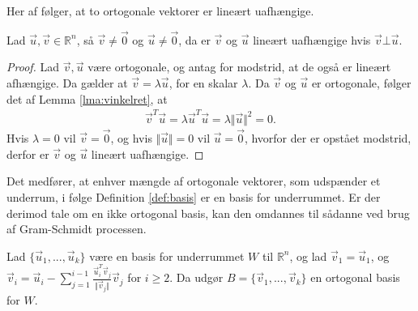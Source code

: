 Her af følger, at to ortogonale vektorer er lineært uafhængige.
\begin{lma}
Lad $\vec{u}, \vec{v} \in \mathds{R}^n$, så $\vec{v} \neq \vec{0}$ og $\vec{u} \neq \vec{0}$, da er $\vec{v}$ og $\vec{u}$ lineært uafhængige hvis $\vec{v} \bot \vec{u}$.
\label{lma:ortolinuaf}
\end{lma}
\begin{proof}
Lad $\vec{v}, \vec{u}$ være ortogonale, og antag for modstrid, at de også er lineært afhængige.
Da gælder at $\vec{v} = \lambda \vec{u}$, for en skalar $\lambda$.
Da $\vec{v}$ og $\vec{u}$ er ortogonale, følger det af Lemma \ref{lma:vinkelret}, at 
\begin{align*}
\vec{v}^T\vec{u} = \lambda\vec{u}^T\vec{u} = \lambda \Vert \vec{u} \Vert^2 = 0.
\end{align*}
Hvis $\lambda = 0$ vil $\vec{v}= \vec{0}$, og hvis $\Vert \vec{u} \Vert = 0$ vil $\vec{u} = \vec{0}$, hvorfor der er opstået modstrid, derfor er $\vec{v}$ og $\vec{u}$ lineært uafhængige.
\end{proof}
Det medfører, at enhver mængde af ortogonale vektorer, som udspænder et underrum, i følge Definition \ref{def:basis} er
en basis for underrummet.
Er der derimod tale om en ikke ortogonal basis, kan den omdannes til sådanne ved brug af Gram-Schmidt processen.
\begin{stn}
Lad $\{\vec{u}_1, ..., \vec{u}_k\}$ være en basis for underrummet $W$ til $\mathds{R}^n$, og lad 
$\vec{v}_1 = \vec{u}_1$, og $\vec{v}_i= \vec{u}_i - \sum_{j=1}^{i-1} \frac{\vec{u}_i^T \vec{v}_j}{\Vert\vec{v}_j\Vert}\vec{v}_j$ for $i \geq 2$.
Da udgør $B = \{\vec{v}_1,..., \vec{v}_k\}$ en ortogonal basis for $W$.
\label{stn:gram}
\end{stn}
